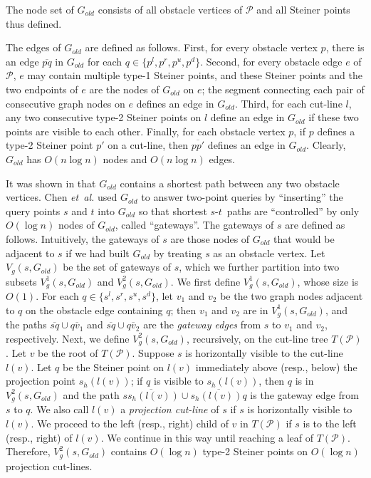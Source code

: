 \documentclass[english,runningheads,11pt]{llncs}
\def\etal{\textsl{et~al. }}
\def\calP{\mathcal{P}}
\def\st{$s$-$t$}
\begin{document}
The node set of $G_{old}$ consists of all obstacle vertices of $\calP$
and all Steiner points thus defined.

The edges of $G_{old}$ are defined as follows. First, for every obstacle vertex $p$,
there is an edge $\overline{pq}$ in $G_{old}$ for each $q\in
\{p^l,p^r,p^u,p^d\}$. Second, for every obstacle edge $e$ of $\calP$, $e$ may contain
multiple type-1 Steiner points, and these Steiner points and the two endpoints
of $e$ are the nodes of $G_{old}$ on $e$;
the segment connecting each pair of consecutive graph nodes on $e$ defines an
edge in $G_{old}$. Third, for each cut-line $l$, any two
consecutive type-2 Steiner points on $l$ define an edge in $G_{old}$ if
these two points are visible to each other.
Finally, for each obstacle vertex $p$, if $p$ defines a type-2
Steiner point $p'$ on a cut-line, then $\overline{pp'}$ defines an
edge in $G_{old}$.  Clearly, $G_{old}$ has $O(n\log n)$ nodes and
$O(n\log n)$ edges.




It was shown in \cite{ref:ClarksonRe87,ref:ClarksonRe88} that
$G_{old}$ contains a shortest path between any two obstacle vertices.
Chen \etal \cite{ref:ChenSh00} used $G_{old}$ to answer two-point
queries by ``inserting'' the query points $s$ and $t$ into $G_{old}$ so that shortest
\st\ paths are ``controlled'' by only $O(\log n)$ nodes of $G_{old}$,
called ``gateways''. The gateways of $s$ are defined as follows.
Intuitively, the gateways of $s$ are those nodes of $G_{old}$ that would be
adjacent to $s$ if we had built $G_{old}$ by treating $s$ as an obstacle vertex.
Let $V_g(s,G_{old})$ be the set of gateways of $s$, which we further
partition into two subsets $V^1_g(s,G_{old})$ and
$V^2_g(s,G_{old})$. We first define $V^1_g(s,G_{old})$, whose size is
$O(1)$. For each $q\in \{s^l,s^r,s^u,s^d\}$, let $v_1$
and $v_2$ be the two graph nodes adjacent to $q$ on the obstacle edge
containing $q$; then $v_1$ and $v_2$ are in $V^1_g(s,G_{old})$, and the
paths $\overline{sq}\cup\overline{qv_1}$ and
$\overline{sq}\cup\overline{qv_2}$ are the {\em gateway edges} from
$s$ to $v_1$ and $v_2$, respectively. Next, we define
$V^2_g(s,G_{old})$, recursively, on the cut-line tree $T(\calP)$.
Let $v$ be the root of $T(\calP)$.
Suppose $s$ is
horizontally visible to the cut-line $l(v)$. Let $q$ be the Steiner point
on $l(v)$ immediately above (resp., below) the projection point $s_h(l(v))$;
if $q$ is visible to $s_h(l(v))$, then $q$ is in $V^2_g(s,G_{old})$
and the path $\overline{ss_h(l(v))}\cup \overline{s_h(l(v))q}$ is the gateway
edge from $s$ to $q$. We also call $l(v)$ a {\em projection cut-line}
of $s$ if $s$ is horizontally visible to $l(v)$.
We proceed to the left (resp., right) child of $v$ in $T(\calP)$ if $s$
is to the left (resp., right) of $l(v)$.
We continue in this way until reaching a leaf of
$T(\calP)$. Therefore, $V^2_g(s,G_{old})$ contains $O(\log n)$
type-2 Steiner points on $O(\log n)$ projection cut-lines.
\end{document}
